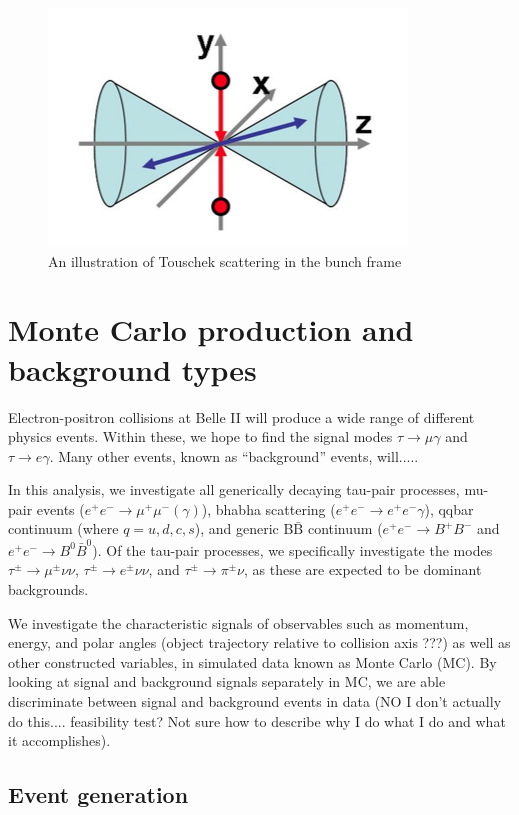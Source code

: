\documentclass[12pt]{thesis}  %
\begin{document}
\begin{figure}[h]
\centering
\includegraphics[width=0.5\linewidth]{images/touschek-beam-frame.png}
\caption{An illustration of Touschek scattering in the bunch frame}
\label{fig:test2}
\end{figure}



\pagebreak

\chapter{Monte Carlo production and background types}

Electron-positron collisions at Belle II will produce a wide range of different physics events. Within these, we hope to find the signal modes $\tau\to\mu\gamma$ and $\tau\to e\gamma$. Many other events, known as ``background'' events, will.....

In this analysis, we investigate all generically decaying tau-pair processes, mu-pair events ($e^+ e^- \to \mu^+ \mu^- (\gamma)$), bhabha scattering ($e^+ e^- \to e^+ e^- \gamma$), qqbar continuum (where $q = u, d, c, s$), and generic B$\bar{\text{B}}$ continuum ($e^+ e^- \to B^+ B^-$ and $e^+ e^- \to B^0 \bar{B}^0$). Of the tau-pair processes, we specifically investigate the modes $\tau^{\pm} \to \mu^{\pm} \nu \nu$, $\tau^{\pm} \to e^{\pm} \nu \nu$, and $\tau^{\pm} \to \pi^{\pm} \nu$, as these are expected to be dominant backgrounds.

We investigate the characteristic signals of observables such as momentum, energy, and polar angles (object trajectory relative to collision axis ???) as well as other constructed variables, in simulated data known as Monte Carlo (MC). By looking at signal and background signals separately in MC, we are able discriminate between signal and background events in data (NO I don't actually do this.... feasibility test? Not sure how to describe why I do what I do and what it accomplishes).

\section{Event generation}
\end{document}
